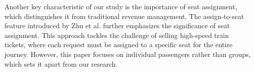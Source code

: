 Another key characteristic of our study is the importance of seat assignment, which distinguishes it from traditional revenue management. The assign-to-seat feature introduced by Zhu et al. \cite{zhu2023assign} further emphasizes the significance of seat assignment. This approach tackles the challenge of selling high-speed train tickets, where each request must be assigned to a specific seat for the entire journey. However, this paper focuses on individual passengers rather than groups, which sets it apart from our research.















\newpage
